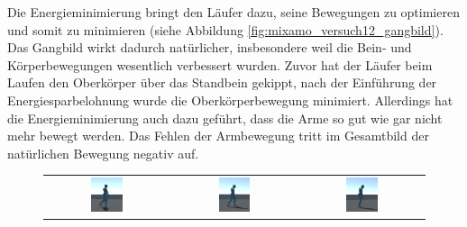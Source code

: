 Die Energieminimierung bringt den Läufer dazu, seine Bewegungen zu optimieren und somit zu minimieren (siehe Abbildung \ref{fig:mixamo_versuch12_gangbild}). Das Gangbild wirkt dadurch natürlicher, insbesondere weil die Bein- und Körperbewegungen wesentlich verbessert wurden. Zuvor hat der Läufer beim Laufen den Oberkörper über das Standbein gekippt, nach der Einführung der Energiesparbelohnung wurde die Oberkörperbewegung minimiert. Allerdings hat die Energieminimierung auch dazu geführt, dass die Arme so gut wie gar nicht mehr bewegt werden. Das Fehlen der Armbewegung tritt im Gesamtbild der natürlichen Bewegung negativ auf.

\begin{figure}[H]
  \centering
  \begin{tabular}{ccc}
    \includegraphics[width=0.27\textwidth]{img/charakter_mixamo_laufen_energiespar1} & \includegraphics[width=0.27\textwidth]{img/charakter_mixamo_laufen_energiespar2}  & \includegraphics[width=0.27\textwidth]{img/charakter_mixamo_laufen_energiespar3} \\

\end{tabular}
\end{figure}
